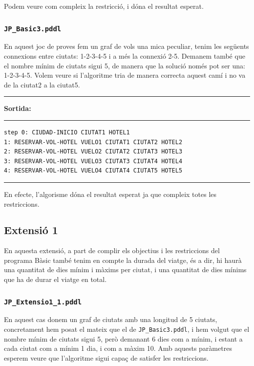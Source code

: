 \documentclass[11pt,a4paper]{article}
\begin{document}
Podem veure com compleix la restricció, i dóna el resultat esperat.

\subsubsection*{\texttt{JP\_Basic3.pddl}}

En aquest joc de proves fem un graf de vols una mica peculiar, tenim les següents connexions entre ciutats: 1-2-3-4-5 i a més la connexió 2-5. Demanem també que el nombre mínim de ciutats sigui 5, de manera que la solució només pot ser una: 1-2-3-4-5. Volem veure si l'algoritme tria de manera correcta aquest camí i no va de la ciutat2 a la ciutat5.

\begin{samepage}
\medskip
\noindent
\rule{0.1\textwidth}{0.5mm}
\textbf{Sortida:}
\rule{0.76\textwidth}{0.5mm}
\begin{verbatim}
step 0: CIUDAD-INICIO CIUTAT1 HOTEL1
1: RESERVAR-VOL-HOTEL VUELO1 CIUTAT1 CIUTAT2 HOTEL2
2: RESERVAR-VOL-HOTEL VUELO2 CIUTAT2 CIUTAT3 HOTEL3
3: RESERVAR-VOL-HOTEL VUELO3 CIUTAT3 CIUTAT4 HOTEL4
4: RESERVAR-VOL-HOTEL VUELO4 CIUTAT4 CIUTAT5 HOTEL5
\end{verbatim}
\rule{\textwidth}{0.5mm}
\medskip
\end{samepage}

En efecte, l'algorisme dóna el resultat esperat ja que compleix totes les restriccions.

\subsection{Extensió 1}

En aquesta extensió, a part de complir els objectius i les restriccions del programa Bàsic també tenim en compte la durada del viatge, és a dir, hi haurà una quantitat de dies mínim i màxims per ciutat, i una quantitat de dies mínims que ha de durar el viatge en total.

\subsubsection*{\texttt{JP\_Extensio1\_1.pddl}}

En aquest cas donem un graf de ciutats amb una longitud de 5 ciutats, concretament hem posat el mateix que el de \texttt{JP\_Basic3.pddl}, i hem volgut que el nombre mínim de ciutats sigui 5, però demanant 6 dies com a mínim, i estant a cada ciutat com a mínim 1 dia, i com a màxim 10. Amb aquests paràmetres esperem veure que l'algoritme sigui capaç de satisfer les restriccions. 
\end{document}
